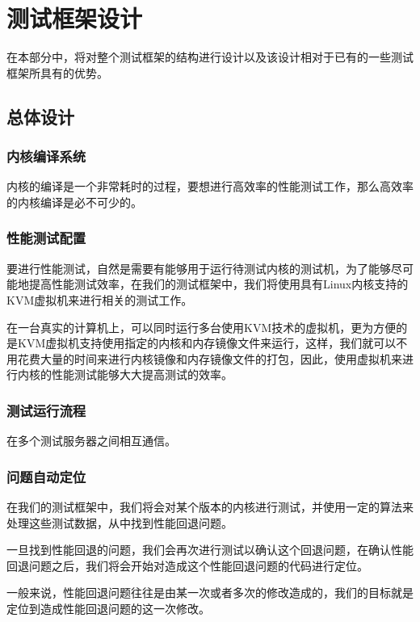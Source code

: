 

\chapter{测试框架设计}

在本部分中，将对整个测试框架的结构进行设计以及该设计相对于已有的一些测试框架所具有的优势。

\section{总体设计}


\subsection{内核编译系统}
内核的编译是一个非常耗时的过程，要想进行高效率的性能测试工作，那么高效率的内核编译是必不可少的。

\subsection{性能测试配置}
要进行性能测试，自然是需要有能够用于运行待测试内核的测试机，为了能够尽可能地提高性能测试效率，在我们的测试框架中，我们将使用具有Linux内核支持的KVM虚拟机来进行相关的测试工作。

在一台真实的计算机上，可以同时运行多台使用KVM技术的虚拟机，更为方便的是KVM虚拟机支持使用指定的内核和内存镜像文件来运行，这样，我们就可以不用花费大量的时间来进行内核镜像和内存镜像文件的打包，因此，使用虚拟机来进行内核的性能测试能够大大提高测试的效率。


\subsection{测试运行流程}

在多个测试服务器之间相互通信。

\subsection{问题自动定位}
在我们的测试框架中，我们将会对某个版本的内核进行测试，并使用一定的算法来处理这些测试数据，从中找到性能回退问题。

一旦找到性能回退的问题，我们会再次进行测试以确认这个回退问题，在确认性能回退问题之后，我们将会开始对造成这个性能回退问题的代码进行定位。

一般来说，性能回退问题往往是由某一次或者多次的修改造成的，我们的目标就是定位到造成性能回退问题的这一次修改。



